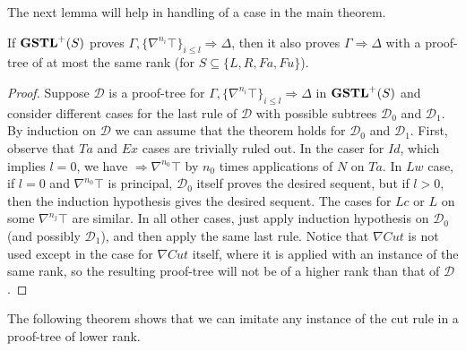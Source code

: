 \documentclass[12pt,a4paper]{article}
\begin{document}
The next lemma will help in handling of a case in the main theorem.

\begin{lem}\label{lem:gstl-top-redundant} If $\mathbf{GSTL}^+(S)$ proves $\Gamma , \{\nabla^{n_i} \top\}_{i \leq l} \Rightarrow \Delta$, then it also proves $\Gamma \Rightarrow \Delta$ with a proof-tree of at most the same rank (for $S \subseteq \{L, R, Fa, Fu\}$).
\end{lem}
\begin{proof}
Suppose $\mathcal{D}$ is a proof-tree for $\Gamma , \{\nabla^{n_i} \top\}_{i \leq l} \Rightarrow \Delta$ in $\mathbf{GSTL}^+(S)$ and consider different cases for the last rule of $\mathcal{D}$ with possible subtrees $\mathcal{D}_0$ and $\mathcal{D}_1$.
By induction on $\mathcal{D}$ we can assume that the theorem holds for $\mathcal{D}_0$ and $\mathcal{D}_1$.
First, observe that $Ta$ and $Ex$ cases are trivially ruled out. In the caser for $Id$, which implies $l = 0$, we have $\Rightarrow \nabla^{n_0} \top$ by $n_0$ times applications of $N$ on $Ta$. In $Lw$ case, if $l = 0$ and $\nabla^{n_0} \top$ is principal, $\mathcal{D}_0$ itself proves the desired sequent, but if $l > 0$, then the induction hypothesis gives the desired sequent. The cases for $Lc$ or $L$ on some $\nabla^{n_j} \top$  are similar. In all other cases, just apply induction hypothesis on $\mathcal{D}_0$ (and possibly $\mathcal{D}_1$), and then apply the same last rule. Notice that $\nabla Cut$ is not used except in the case for $\nabla Cut$ itself, where it is applied with an instance of the same rank, so the resulting proof-tree will not be of a higher rank than that of $\mathcal{D}$.
\end{proof}

The following theorem shows that we can imitate any instance of the cut rule in a proof-tree of lower rank.
\end{document}
